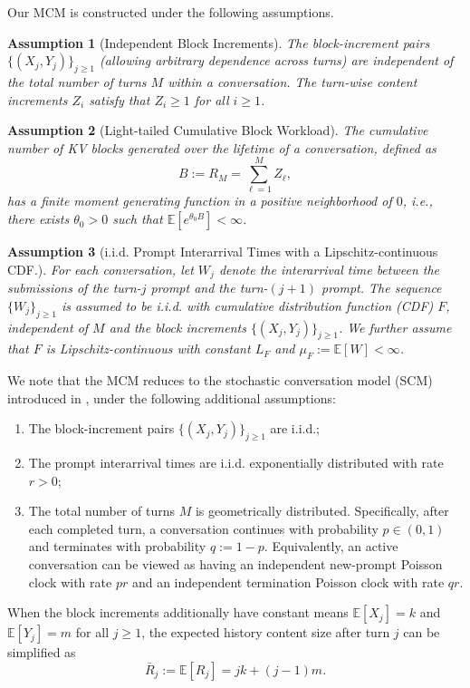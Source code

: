 \documentclass{article}
\newtheorem{assumption}[assumption]{Assumption}
\theoremstyle{definition}
\newcommand{\E}{\mathbb E}
\begin{document}
Our MCM is constructed under the following assumptions.

\begin{assumption}[Independent Block Increments]
    \label{ass:independent block incrememts}
    The block-increment pairs $\{(X_j,Y_j)\}_{j\geq1}$ (allowing arbitrary dependence across turns) are independent of the total number of turns $M$ within a conversation. The turn-wise content increments $Z_i$ satisfy that $Z_i \ge 1$ for all $i\ge 1$.
\end{assumption}

\begin{assumption}[Light-tailed Cumulative Block Workload]
    \label{ass: Regularity of one cumulative conversation blocks}
    The cumulative number of KV blocks generated over the lifetime of a conversation, defined as
    \begin{equation}
        \label{equ: cumulative number of blocks}
        B:=R_M=\sum_{\ell=1}^{M}Z_\ell,
    \end{equation}
    has a finite moment generating function in a positive neighborhood of $0$, i.e., there exists $\theta_0>0$ such that $\E[e^{\theta_0 B}]<\infty$.
\end{assumption}

\begin{assumption}[i.i.d. Prompt Interarrival Times with a Lipschitz-continuous CDF.]
    \label{ass: Exponential Prompt Inter-arrival Time}
    For each conversation, let $W_j$ denote the interarrival time between the submissions of the turn-$j$ prompt and the turn-$(j+1)$ prompt. The sequence $\{W_j\}_{j\geq1}$ is assumed to be i.i.d. with cumulative distribution function (CDF) $F$, independent of $M$ and the block increments $\{(X_j,Y_j)\}_{j\geq1}$. We further assume that $F$ is Lipschitz-continuous with constant $L_F$ and $\mu_F:= \E [W] <\infty$.
\end{assumption}



We note that the MCM reduces to the stochastic conversation model (SCM) introduced in \cite{zhang2026tail}, under the following additional assumptions:
\begin{enumerate}
    \item The block-increment pairs $\{(X_j,Y_j)\}_{j\geq1}$ are i.i.d.;
    \item The prompt interarrival times are i.i.d. exponentially distributed with rate $r>0$;
    \item The total number of turns $M$ is geometrically distributed. Specifically, after each completed turn, a conversation continues with probability $p\in(0,1)$ and terminates with probability $q:=1-p$. Equivalently, an active conversation can be viewed as having an independent new-prompt Poisson clock with rate $pr$ and an independent termination Poisson clock with rate $qr$.
\end{enumerate}
When the block increments additionally have constant means $\E[X_j]=k$ and $\E[Y_j]=m$ for all $j\geq1$, the expected history content size after turn $j$ can be simplified as
\begin{equation*}
    \bar R_j:=\E[R_j]=jk+(j-1)m.
\end{equation*}
\end{document}
